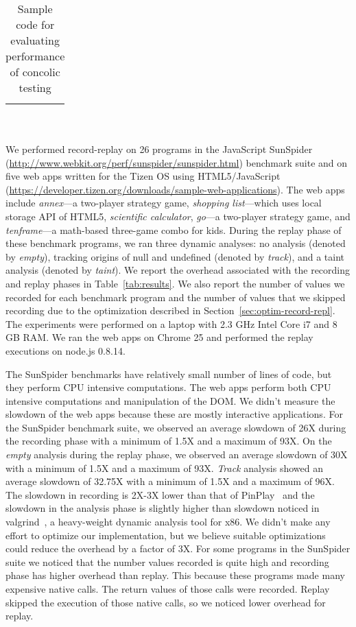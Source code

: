 \documentclass{sig-alternate}
\begin{document}
\begin{table*}
\begin{minipage}{0.38\textwidth}
\begin{tabular}{|r|}
{\begin{lstlisting}[mathescape]
\end{lstlisting}
}\\
\hline
\end{tabular}
\caption{Sample code for evaluating performance of concolic testing}
\label{tab:conc}
\end{minipage}
\end{table*}

We performed record-replay on 26 programs in the JavaScript SunSpider
(\url{http://www.webkit.org/perf/sunspider/sunspider.html}) benchmark
suite and on five web apps written for the Tizen OS using
HTML5/JavaScript
(\url{https://developer.tizen.org/downloads/sample-web-applications}).
The web apps include \emph{annex}---a two-player strategy game,
\emph{shopping list}---which uses local storage API of HTML5,
\emph{scientific calculator}, \emph{go}---a two-player strategy game,
and \emph{tenframe}---a math-based three-game combo for kids.  During
the replay phase of these benchmark programs, we ran three dynamic
analyses: no analysis (denoted by \emph{empty}), tracking origins of
null and undefined (denoted by \emph{track}), and a taint analysis
(denoted by \emph{taint}).  We report the overhead associated with the
recording and replay phases in Table~\ref{tab:results}.  We also
report the number of values we recorded for each benchmark program and
the number of values that we skipped recording due to the optimization
described in Section~\ref{sec:optim-record-repl}.  The experiments
were performed on a laptop with 2.3 GHz Intel Core i7 and 8 GB RAM.
We ran the web apps on Chrome 25 and performed the replay executions
on node.js 0.8.14.

The SunSpider benchmarks have relatively small number of lines of
code, but they perform CPU intensive computations.  The web apps
perform both CPU intensive computations and manipulation of the DOM.
We didn't measure the slowdown of the web apps because these are
mostly interactive applications.  For the SunSpider benchmark suite,
we observed an average slowdown of 26X during the recording phase with
a minimum of 1.5X and a maximum of 93X.  On the \emph{empty} analysis
during the replay phase, we observed an average slowdown of 30X with a
minimum of 1.5X and a maximum of 93X.  \emph{Track} analysis showed an
average slowdown of 32.75X with a minimum of 1.5X and a maximum of
96X.  The slowdown in recording is 2X-3X lower than that of
PinPlay~\cite{Patil:2010:PFD:1772954.1772958} and the slowdown in the
analysis phase is slightly higher than slowdown noticed in
valgrind~\cite{Nethercote:2007:VFH:1250734.1250746}, a heavy-weight
dynamic analysis tool for x86.  We didn't make any effort to optimize
our implementation, but we believe suitable optimizations could reduce
the overhead by a factor of 3X.  For some programs in the SunSpider
suite we noticed that the number values recorded is quite high and
recording phase has higher overhead than replay.  This because these
programs made many expensive native calls.  The return values of those
calls were recorded.  Replay skipped the execution of those native
calls, so we noticed lower overhead for replay.
\end{document}
